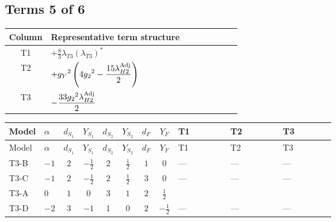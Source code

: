 \documentclass[8pt]{article}
\begin{document}
\begin{landscape}
\subsection*{Terms 5 of 6}
\begin{center}
\begin{tabular}{@{}c >{\raggedright\arraybackslash}p{0.82\linewidth}@{}}
\toprule
Column & Representative term structure \\
\midrule
T1 & \(\displaystyle +\frac{8}{3} {\lambda_{T3}} \left({\lambda_{T3}}\right)^{*}\) \\
\midrule
T2 & \(\displaystyle +{g_Y}^2 \left(4 {g_2}^2-\frac{15 {\lambda_{H2}^{\rm Adj}}}{2}\right)\) \\
\midrule
T3 & \(\displaystyle -\frac{33 {g_2}^2 {\lambda_{H2}^{\rm Adj}}}{2}\) \\
\midrule
\bottomrule
\end{tabular}
\end{center}
\smallskip
\tiny
\begin{longtable}{@{}llcccccc >{\raggedright\arraybackslash}p{0.21\linewidth} >{\raggedright\arraybackslash}p{0.21\linewidth} >{\raggedright\arraybackslash}p{0.21\linewidth}@{}}
\toprule
Model & $\alpha$ & $d_{S_1}$ & $Y_{S_1}$ & $d_{S_2}$ & $Y_{S_2}$ & $d_F$ & $Y_F$ & T1 & T2 & T3 \\
\midrule
\endfirsthead
\toprule
Model & $\alpha$ & $d_{S_1}$ & $Y_{S_1}$ & $d_{S_2}$ & $Y_{S_2}$ & $d_F$ & $Y_F$ & T1 & T2 & T3 \\
\midrule
\endhead
T3-B & $-1$ & $2$ & $-\frac{1}{2}$ & $2$ & $\frac{1}{2}$ & $1$ & $0$ & --- & --- & --- \\
\midrule
T3-C & $-1$ & $2$ & $-\frac{1}{2}$ & $2$ & $\frac{1}{2}$ & $3$ & $0$ & --- & --- & --- \\
\midrule
T3-A & $0$ & $1$ & $0$ & $3$ & $1$ & $2$ & $\frac{1}{2}$ & \scriptsize\adjustbox{max width=\linewidth}{$\begin{gathered} +\frac{8}{3} {\lambda_{T3}} \left({\lambda_{T3}}\right)^{*}\end{gathered}$} & \scriptsize\adjustbox{max width=\linewidth}{$\begin{gathered} +{g_Y}^2 \left(4 {g_2}^2-\frac{15 {\lambda_{H2}^{\rm Adj}}}{2}\right)\end{gathered}$} & \scriptsize\adjustbox{max width=\linewidth}{$\begin{gathered} -\frac{33 {g_2}^2 {\lambda_{H2}^{\rm Adj}}}{2}\end{gathered}$} \\
\midrule
T3-D & $-2$ & $3$ & $-1$ & $1$ & $0$ & $2$ & $-\frac{1}{2}$ & --- & --- & --- \\

\end{longtable}
\end{landscape}
\end{document}

